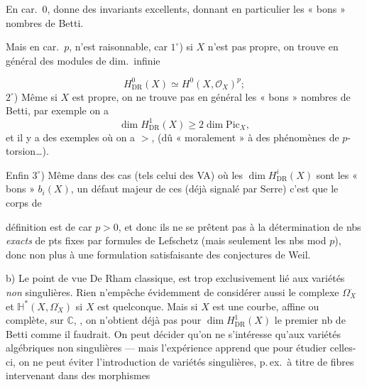 \documentclass[11pt,a4paper]{article}
\begin{document}
 En car.\ $0$,
donne des invariants excellents, donnant en particulier les « bons »
nombres de Betti.

Mais en car.\ $p$, \struck{\ill{}} n'est 
raisonnable, car $1^\circ$) si $X$ n'est pas propre, on trouve en général
des modules de dim.\ infinie

\[
  H^{0}_{\mathrm{DR}}(X) \simeq H^{0}(X, \mathcal{O}_X)^{p} ;
\]
$2^\circ$) Même si $X$ est propre, on ne trouve pas en général les « bons »
nombres de Betti, par exemple on a
\[
  \dim H^{1}_{\mathrm{DR}}(X) \geq 2 \dim \mathrm{Pic}_X ,
\]
et il y a des exemples où on a $>$, (dû « moralement » à des phénomènes de
$p$-torsion\ldots).

Enfin $3^\circ$) Même dans des cas (tels celui des VA) où les
$\dim H^{i}_{\mathrm{DR}}(X)$  sont les « bons »
$b_i(X)$, un défaut majeur de ces  (déjà signalé par
Serre) c'est que le corps de


définition est de car $p > 0$, et donc ils ne se prêtent pas à la
détermination de nbs \emph{exacts} de pts fixes par formules de Lefschetz
(mais seulement les nbs mod $p$), donc non plus à une formulation
satisfaisante des conjectures de Weil.

b) Le point de vue De
Rham classique,  est trop
exclusivement lié aux variétés \emph{non} singulières. Rien n'empêche
évidemment de considérer aussi le complexe $\Omega^{\cdot}_X$ et
$\mathbb{H}^{*}(X, \Omega^{\cdot}_X)$ si $X$ est quelconque. Mais si $X$
est une courbe, affine  ou complète, sur
$\mathbb{C}$,  , on n'obtient déjà pas pour $\dim H^{1}_{\mathrm{DR}}(X)$ le
premier nb de Betti comme il faudrait. On peut décider qu'on ne
s'intéresse qu'aux variétés algébriques non singulières --- mais
l'expérience apprend que \struck{\ill{}} pour étudier celles-ci, on ne peut
éviter l'introduction de variétés singulières, p.\,ex.\ à titre de fibres
intervenant dans des  morphismes
\end{document}
